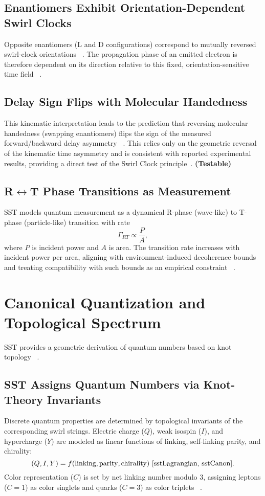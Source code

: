 \documentclass[10pt,reprint,aps,onecolumn,nofootinbib]{revtex4-2}
\newcommand{\testable}{\textbf{(Testable)}}
\begin{document}
    \subsection*{Enantiomers Exhibit Orientation-Dependent Swirl Clocks}
        Opposite enantiomers (L and D configurations) correspond to mutually reversed swirl-clock orientations~ \cite{sstAttosecondPhotoionization}. The propagation phase of an emitted electron is therefore dependent on its direction relative to this fixed, orientation-sensitive time field~ \cite{sstAttosecondPhotoionization}.

    \subsection*{Delay Sign Flips with Molecular Handedness}
        This kinematic interpretation leads to the prediction that reversing molecular handedness (swapping enantiomers) flips the sign of the measured forward/backward delay asymmetry~ \cite{sstAttosecondPhotoionization}. This relies only on the geometric reversal of the kinematic time asymmetry and is consistent with reported experimental results, providing a direct test of the Swirl Clock principle~\cite{sstAttosecondPhotoionization}. \testable

    \subsection*{R$\leftrightarrow$T Phase Transitions as Measurement}
        SST models quantum measurement as a dynamical R-phase (wave-like) to T-phase (particle-like) transition with rate
        \[
            \Gamma_{RT} \propto \frac{P}{A},
        \]
        where $P$ is incident power and $A$ is area. The transition rate increases with incident power per area, aligning with environment-induced decoherence bounds and treating compatibility with such bounds as an empirical constraint~ \cite{sstCanon}.

\section{Canonical Quantization and Topological Spectrum}\label{sec:quantization}
SST provides a geometric derivation of quantum numbers based on knot topology~ \cite{sstCanon,sstLagrangian,Kauffman2001}.

    \subsection*{SST Assigns Quantum Numbers via Knot-Theory Invariants}
        Discrete quantum properties are determined by topological invariants of the corresponding swirl strings. Electric charge ($Q$), weak isospin ($I$), and hypercharge ($Y$) are modeled as linear functions of linking, self-linking parity, and chirality:
        \[
            (Q, I, Y) = f(\text{linking}, \text{parity}, \text{chirality})~\cite{sstLagrangian, sstCanon}.
        \]
        Color representation ($C$) is set by net linking number modulo $3$, assigning leptons ($C=1$) as color singlets and quarks ($C=3$) as color triplets~ \cite{sstLagrangian}.
\end{document}
